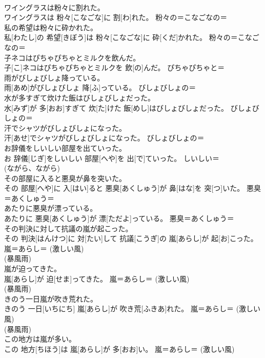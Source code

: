 \documentclass[8pt]{extreport}
\begin{document}
\begin{CJK}{UTF8}{min}
{\\	ワイングラスは粉々に割れた。	
\\	ワイングラスは 粉々[こなごな]に 割[わ]れた。	粉々の＝こなごなの＝ 
\\	私の希望は粉々に砕かれた。	
\\	私[わたし]の 希望[きぼう]は 粉々[こなごな]に 砕[くだ]かれた。	粉々の＝こなごなの＝ 
\\	子ネコはぴちゃぴちゃとミルクを飲んだ。	
\\	子[こ]ネコはぴちゃぴちゃとミルクを 飲[の]んだ。	ぴちゃぴちゃと＝ 
\\	雨がびしょびしょ降っている。	
\\	雨[あめ]がびしょびしょ 降[ふ]っている。	びしょびしょの＝ 
\\	水が多すぎて炊けた飯はびしょびしょだった。	
\\	水[みず]が 多[おお]すぎて 炊[た]けた 飯[めし]はびしょびしょだった。	びしょびしょの＝ 
\\	汗でシャツがびしょびしょになった。	
\\	汗[あせ]でシャツがびしょびしょになった。	びしょびしょの＝ 
\\	お辞儀をしいしい部屋を出ていった。	
\\	お 辞儀[じぎ]をしいしい 部屋[へや]を 出[で]ていった。	しいしい＝ 
\\	(ながら、ながら)
\\	その部屋に入ると悪臭が鼻を突いた。	
\\	その 部屋[へや]に 入[はい]ると 悪臭[あくしゅう]が 鼻[はな]を 突[つ]いた。	悪臭＝あくしゅう＝ 
\\	あたりに悪臭が漂っている。	
\\	あたりに 悪臭[あくしゅう]が 漂[ただよ]っている。	悪臭＝あくしゅう＝ 
\\	その判決に対して抗議の嵐が起こった。	
\\	その 判決[はんけつ]に 対[たい]して 抗議[こうぎ]の 嵐[あらし]が 起[お]こった。	嵐＝あらし＝ (激しい風) 
\\	(暴風雨) 
\\	嵐が迫ってきた。	
\\	嵐[あらし]が 迫[せま]ってきた。	嵐＝あらし＝ (激しい風) 
\\	(暴風雨) 
\\	きのう一日嵐が吹き荒れた。	
\\	きのう 一日[いちにち] 嵐[あらし]が 吹き荒[ふきあ]れた。	嵐＝あらし＝ (激しい風) 
\\	(暴風雨) 
\\	この地方は嵐が多い。	
\\	この 地方[ちほう]は 嵐[あらし]が 多[おお]い。	嵐＝あらし＝ (激しい風) 
}
\end{CJK}
\end{document}
